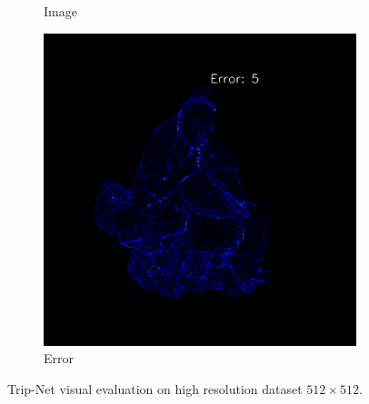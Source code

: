\begin{figure}[th]
\begin{subfigure}[b]{0.32\linewidth}
		\caption{Image}
	\end{subfigure}
	\begin{subfigure}[b]{0.32\linewidth}
		\includegraphics[width=\linewidth]{./Figures/comparison_512/fancy_eval_11_error_Trip-Net-512.png}
		\caption{Error}
	\end{subfigure}
	
	\decoRule
	\caption{Trip-Net visual evaluation on high resolution dataset $ 512 \times 512 $.}
	\label{fig:trip-eval-high-resolution}
\end{figure}




